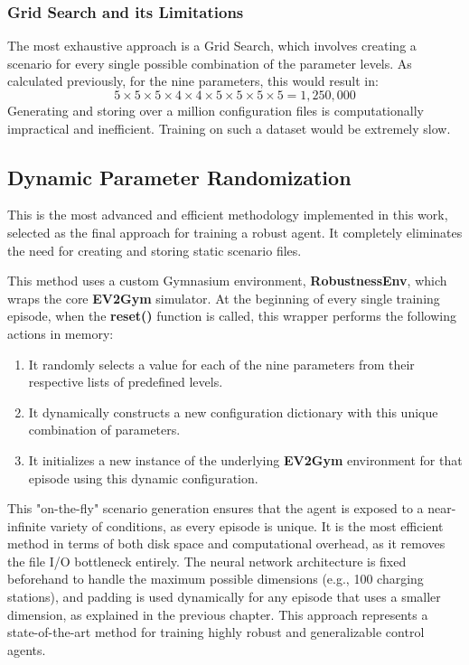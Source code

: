 \subsubsection*{Grid Search and its Limitations}
\noindent
The most exhaustive approach is a Grid Search, which involves creating a scenario for every single possible combination of the parameter levels. As calculated previously, for the nine parameters, this would result in:
\begin{equation}
    5 \times 5 \times 5 \times 4 \times 4 \times 5 \times 5 \times 5 \times 5 = 1,250,000
\end{equation}
\noindent
Generating and storing over a million configuration files is computationally impractical and inefficient. Training on such a dataset would be extremely slow.


\subsection{Dynamic Parameter Randomization}
\noindent
This is the most advanced and efficient methodology implemented in this work, selected as the final approach for training a robust agent. It completely eliminates the need for creating and storing static scenario files.

\noindent
This method uses a custom Gymnasium environment, \textbf{RobustnessEnv}, which wraps the core \textbf{EV2Gym} simulator. At the beginning of every single training episode, when the \textbf{reset()} function is called, this wrapper performs the following actions in memory:
\begin{enumerate}
    \item It randomly selects a value for each of the nine parameters from their respective lists of predefined levels.
    \item It dynamically constructs a new configuration dictionary with this unique combination of parameters.
    \item It initializes a new instance of the underlying \textbf{EV2Gym} environment for that episode using this dynamic configuration.
\end{enumerate}
\noindent
This "on-the-fly" scenario generation ensures that the agent is exposed to a near-infinite variety of conditions, as every episode is unique. It is the most efficient method in terms of both disk space and computational overhead, as it removes the file I/O bottleneck entirely. The neural network architecture is fixed beforehand to handle the maximum possible dimensions (e.g., 100 charging stations), and padding is used dynamically for any episode that uses a smaller dimension, as explained in the previous chapter. This approach represents a state-of-the-art method for training highly robust and generalizable control agents.




